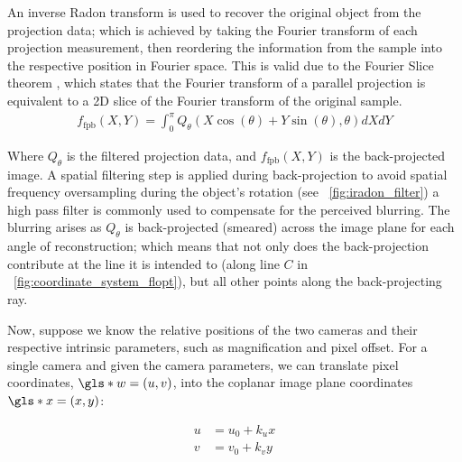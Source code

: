 \documentclass{osa-article}
\begin{document}
An inverse Radon transform is used to recover the original object from the projection data; which is achieved by taking the Fourier transform of each projection measurement, then reordering the information from the sample into the respective position in Fourier space.
This is valid due to the Fourier Slice theorem%
, which states that the Fourier transform of a parallel projection is equivalent to a 2D slice of the Fourier transform of the original sample.
\begin{align}
f_{\text{fpb}}(X,Y) = \int_{0}^{\pi} Q_\theta (X\cos(\theta)+Y\sin(\theta),\theta)dXdY
\end{align}

Where \(Q_\theta \) is the filtered projection data, and \(f_{\text{fpb}}(X,Y)\) is the back-projected image.
A spatial filtering step is applied during back-projection to avoid spatial frequency oversampling during the object’s rotation (see \figurename~\ref{fig:iradon_filter})
a high pass filter is commonly used to compensate for the perceived blurring.
The blurring arises as \(Q_\theta \) is back-projected (smeared) across the image plane for each angle of reconstruction; which means that not only does the back-projection contribute at the line it is intended to (along line \(C\) in \figurename~\ref{fig:coordinate_system_flopt}), but all other points along the back-projecting ray.


Now, suppose we know the relative positions of the two cameras and their respective intrinsic parameters, such as magnification and pixel offset.
For a single camera and given the camera parameters, we can translate pixel coordinates, \(\gls*{w} = (u, v)\), into the coplanar image plane coordinates \(\gls*{x}=(x, y)\):

\begin{align}
    u &= u_0 + k_u x \\
    v &= v_0 + k_v y
\end{align}
\end{document}
